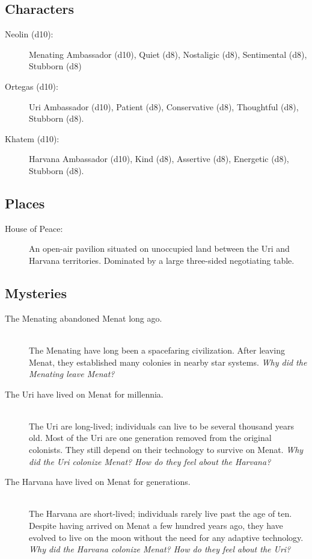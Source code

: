 \documentclass[11pt, a5paper, parskip=half-, DIV=12]{scrartcl}
\begin{document}
\newpage

\subsection*{Characters}
\begin{description}
	\item[Neolin (d10):] Menating Ambassador (d10), Quiet (d8),  Nostaligic (d8), Sentimental (d8), Stubborn (d8)
	\item[Ortegas (d10):] Uri Ambassador (d10), Patient (d8), Conservative (d8),  Thoughtful (d8), Stubborn (d8).
	\item[Khatem (d10):] Harvana Ambassador (d10), Kind (d8), Assertive (d8), Energetic (d8), Stubborn (d8).
\end{description}

\subsection*{Places}
\begin{description}
	\item[House of Peace:] An open-air pavilion situated on unoccupied land between the Uri and Harvana territories. Dominated by a large three-sided negotiating table.
\end{description}

\subsection*{Mysteries}
\begin{description}
	\item[The Menating abandoned Menat long ago.] \phantom{} \\ The Menating have long been a spacefaring civilization. After leaving Menat, they established many colonies in nearby star systems. \textit{Why did the Menating leave Menat?}
	\item[The Uri have lived on Menat for millennia.] \phantom{} \\ The Uri are long-lived; individuals can live to be several thousand years old. Most of the Uri are one generation removed from the original colonists. They still depend on their technology to survive on Menat. \textit{Why did the Uri colonize Menat? How do they feel about the Harvana?}
	\item[The Harvana have lived on Menat for generations.] \phantom{} \\ The Harvana are short-lived; individuals rarely live past the age of ten. Despite having arrived on Menat a few hundred years ago, they have evolved to live on the moon without the need for any adaptive technology. \textit{Why did the Harvana colonize Menat? How do they feel about the Uri?}

\end{description}
\end{document}
